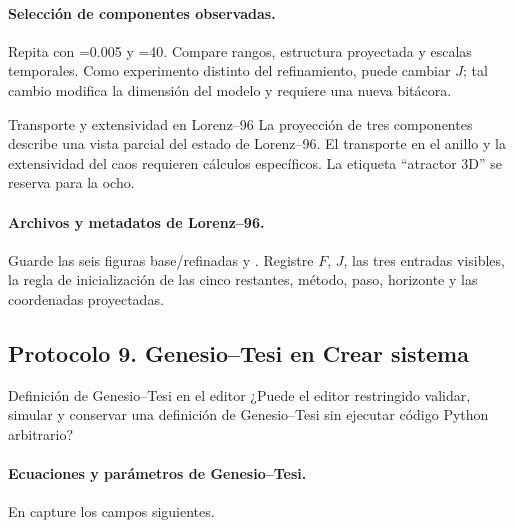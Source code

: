 \paragraph{Selección de componentes observadas.}
Repita con =0.005 y =40. Compare rangos,
estructura proyectada y escalas temporales. Como experimento distinto del
refinamiento, puede cambiar \(J\); tal cambio modifica la dimensión del modelo
y requiere una nueva bitácora.

\begin{cajaalerta}{Transporte y extensividad en Lorenz--96}
La proyección de tres componentes describe una vista parcial del estado de
Lorenz--96. El transporte en el anillo y la extensividad del caos requieren cálculos específicos. La etiqueta ``atractor 3D'' se reserva para la
ocho.
\end{cajaalerta}

\paragraph{Archivos y metadatos de Lorenz--96.}
Guarde las seis figuras base/refinadas y
. Registre \(F\), \(J\), las tres entradas
visibles, la regla de inicialización de las cinco restantes, método, paso,
horizonte y las coordenadas proyectadas.

\subsection{Protocolo 9. Genesio--Tesi en Crear sistema}

\begin{cajaazul}{Definición de Genesio--Tesi en el editor}
¿Puede el editor restringido validar, simular y conservar una definición de
Genesio--Tesi sin ejecutar código Python arbitrario?
\end{cajaazul}

\paragraph{Ecuaciones y parámetros de Genesio--Tesi.}
En  capture los campos siguientes.

